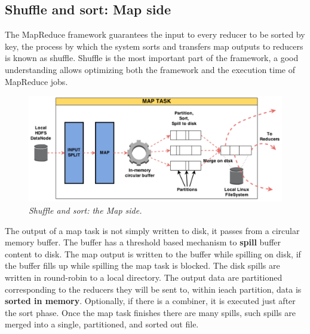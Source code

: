 		\subsection{Shuffle and sort: Map side}
			\par
			The MapReduce framework guarantees the input to every reducer to be sorted by key, the process by which the system sorts and transfers map outputs to reducers is known as shuffle.
			\newline
			Shuffle is the most important part of the framework, a good understanding allows optimizing both the framework and the execution time of MapReduce jobs.
			\begin{figure}[h!]
				\centering
				\includegraphics[width=\linewidth]{images/sasmapside.png}
				\caption{\textit{Shuffle and sort: the Map side.}}
			\end{figure}
			\par
			The output of a map task is not simply written to disk, it passes from a circular memory buffer. The buffer has a threshold based mechanism to \textbf{spill} buffer content to disk. The map output is written to the buffer while spilling on disk, if the buffer fills up while spilling the map task is blocked.
			\newline
			The disk spills are written in round-robin to a local directory. The output data are partitioned corresponding to the reducers they will be sent to, within ieach partition, data is \textbf{sorted in memory}.
			\newline
			Optionally, if there is a combiner, it is executed just after the sort phase.
			\newline
			Once the map task finishes there are many spills, such spills are merged into a single, partitioned, and sorted out file.
